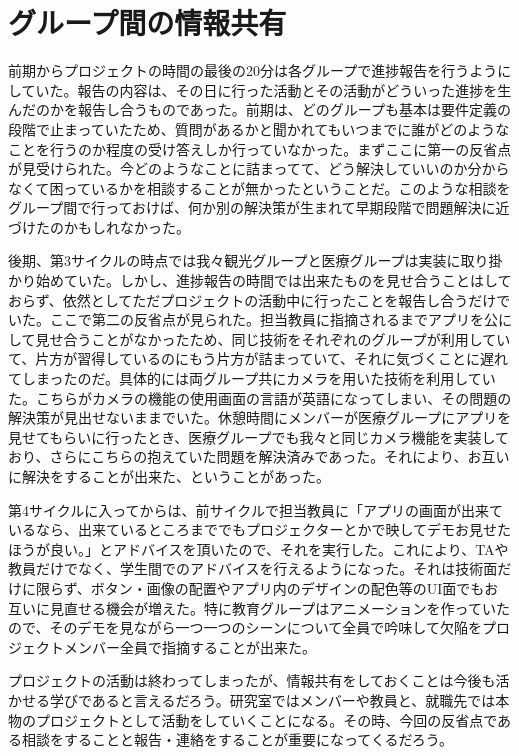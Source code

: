 \section{グループ間の情報共有}
前期からプロジェクトの時間の最後の20分は各グループで進捗報告を行うようにしていた。報告の内容は、その日に行った活動とその活動がどういった進捗を生んだのかを報告し合うものであった。前期は、どのグループも基本は要件定義の段階で止まっていたため、質問があるかと聞かれてもいつまでに誰がどのようなことを行うのか程度の受け答えしか行っていなかった。まずここに第一の反省点が見受けられた。今どのようなことに詰まってて、どう解決していいのか分からなくて困っているかを相談することが無かったということだ。このような相談をグループ間で行っておけば、何か別の解決策が生まれて早期段階で問題解決に近づけたのかもしれなかった。
\par 後期、第3サイクルの時点では我々観光グループと医療グループは実装に取り掛かり始めていた。しかし、進捗報告の時間では出来たものを見せ合うことはしておらず、依然としてただプロジェクトの活動中に行ったことを報告し合うだけでいた。ここで第二の反省点が見られた。担当教員に指摘されるまでアプリを公にして見せ合うことがなかったため、同じ技術をそれぞれのグループが利用していて、片方が習得しているのにもう片方が詰まっていて、それに気づくことに遅れてしまったのだ。具体的には両グループ共にカメラを用いた技術を利用していた。こちらがカメラの機能の使用画面の言語が英語になってしまい、その問題の解決策が見出せないままでいた。休憩時間にメンバーが医療グループにアプリを見せてもらいに行ったとき、医療グループでも我々と同じカメラ機能を実装しており、さらにこちらの抱えていた問題を解決済みであった。それにより、お互いに解決をすることが出来た、ということがあった。
\par 第4サイクルに入ってからは、前サイクルで担当教員に「アプリの画面が出来ているなら、出来ているところまででもプロジェクターとかで映してデモお見せたほうが良い。」とアドバイスを頂いたので、それを実行した。これにより、TAや教員だけでなく、学生間でのアドバイスを行えるようになった。それは技術面だけに限らず、ボタン・画像の配置やアプリ内のデザインの配色等のUI面でもお互いに見直せる機会が増えた。特に教育グループはアニメーションを作っていたので、そのデモを見ながら一つ一つのシーンについて全員で吟味して欠陥をプロジェクトメンバー全員で指摘することが出来た。
\par プロジェクトの活動は終わってしまったが、情報共有をしておくことは今後も活かせる学びであると言えるだろう。研究室ではメンバーや教員と、就職先では本物のプロジェクトとして活動をしていくことになる。その時、今回の反省点である相談をすることと報告・連絡をすることが重要になってくるだろう。
